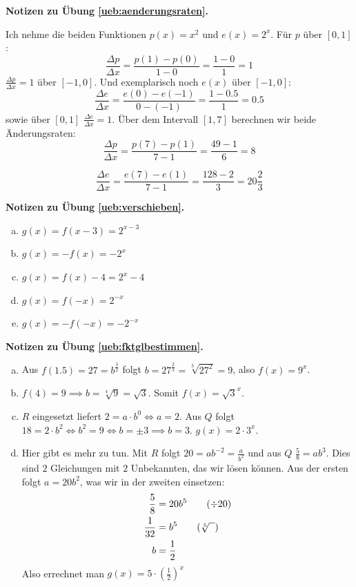 \documentclass[%
11pt,%
twoside,%
titlepage,%
swissgerman,%
headsepline%
]{scrartcl}
\newcommand{\faReturnGray}{\textcolor{gray}{\faMailReply}} %
\theoremstyle{definition}
\theoremstyle{plain}
\newcommand{\concatueb}[1]{ueb:#1}%
\newcommand{\concatlsg}[1]{lsg:#1}%
\newenvironment{lsg}[1]{%
    \par\noindent\textbf{Notizen zu Übung \ref{\concatueb{#1}}.}%
    \label{\concatlsg{#1}} %
    \hfill\hyperref[\concatueb{#1}]{\faReturnGray}\par %
}{%
    \par%
}
\begin{document}
\begin{lsg}{aenderungsraten}
    Ich nehme die beiden Funktionen $p(x)=x^2$ und $e(x)=2^x$. Für $p$ über $[0,1]$:
    $$\frac{\Delta p}{\Delta x}=\frac{p(1)-p(0)}{1-0}=\frac{1-0}{1}=1$$
    $\frac{\Delta p}{\Delta x}=1$ über $[-1,0]$.
    Und exemplarisch noch $e(x)$ über $[-1,0]$:
    $$\frac{\Delta e}{\Delta x}=\frac{e(0)-e(-1)}{0-(-1)}=\frac{1-0.5}{1}=0.5$$
    sowie über $[0,1]$ $\frac{\Delta e}{\Delta x}=1$.
    Über dem Intervall $[1,7]$ berechnen wir beide Änderungsraten:
    $$\frac{\Delta p}{\Delta x}=\frac{p(7)-p(1)}{7-1}=\frac{49-1}{6}=8$$

    $$\frac{\Delta e}{\Delta x}=\frac{e(7)-e(1)}{7-1}=\frac{128-2}{3}=20\frac{2}{3}$$
\end{lsg}
\begin{lsg}{verschieben}
    \begin{enumerate}[a)]
        \item $g(x)=f(x-3)=2^{x-3}$
        \item $g(x)=-f(x)=-2^x$
        \item $g(x)=f(x)-4=2^x-4$
        \item $g(x)=f(-x)=2^{-x}$
        \item $g(x)=-f(-x)=-2^{-x}$
    \end{enumerate}
\end{lsg}

\begin{lsg}{fktglbestimmen}
    \begin{enumerate}[a)]
        \item Aus $f(1.5)=27=b^\frac{3}{2}$ folgt $b=27^\frac{2}{3}=\sqrt[3]{27^2}=9$, also $f(x)=9^x$.
        \item $f(4)=9\implies b=\sqrt[4]{9}=\sqrt{3}$. Somit $f(x)=\sqrt{3}^x$.
        \item $R$ eingesetzt liefert $2=a\cdot b^0\Leftrightarrow a=2$. Aus $Q$ folgt $18=2\cdot b^2\Leftrightarrow b^2=9\Leftrightarrow b=\pm3\implies b=3$. $g(x)=2\cdot3^x$.
        \item Hier gibt es mehr zu tun. Mit $R$ folgt $20=ab^{-2}=\frac{a}{b^2}$ und aus $Q$ $\frac{5}{8}=ab^3$. Dies sind $2$ Gleichungen mit $2$  Unbekannten, das wir lösen können. Aus der ersten folgt $a=20b^2$, was wir in der zweiten einsetzen:
        \begin{align*}
            \frac{5}{8} &= 20b^5\tag{$\div20$}\\
            \frac{1}{32} &= b^5\tag{$\sqrt[5]{\phantom{x}}$}\\
            b &= \frac{1}{2}
        \end{align*}
        Also errechnet man $g(x)=5\cdot\left(\frac{1}{2}\right)^x$
    \end{enumerate}
\end{lsg}
\end{document}
